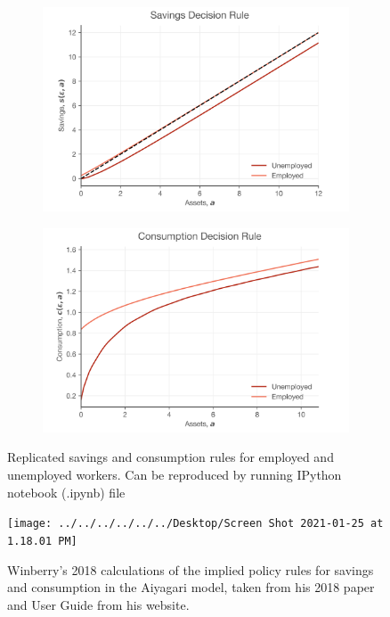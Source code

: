 \documentclass[11pt]{article}
\begin{document}
\begin{figure}[htp]
\begin{subfigure}{.5\textwidth}
\centering
\includegraphics[scale=.45]{Figures/save_rule.png}

\end{subfigure}
\begin{subfigure}{.5\textwidth}
\centering
\includegraphics[scale=.45]{Figures/cons_rule.png}
\end{subfigure}
\caption{Replicated savings and consumption rules for employed and unemployed workers. Can be reproduced by running IPython notebook (.ipynb) file  }
\label{con_sav_rep}
\vspace*{\floatsep}
\centering
\texttt{[image: ../../../../../../Desktop/Screen Shot 2021-01-25 at 1.18.01 PM]}
\caption{Winberry's 2018 calculations of the implied policy rules for savings and consumption in the Aiyagari model, taken from his 2018 paper and User Guide from his website.}
\label{con_sav_orig}
\end{figure}	
\end{document}
